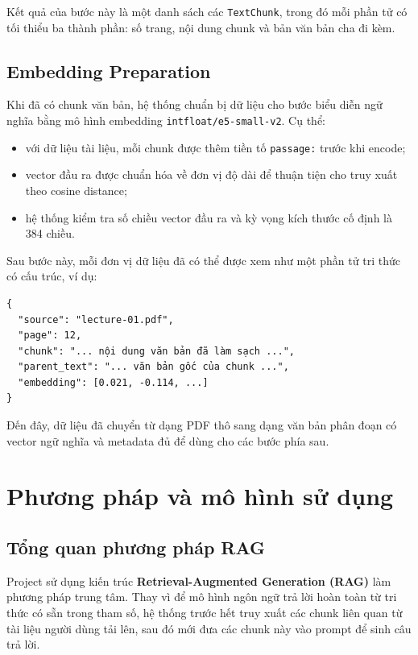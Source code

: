 \documentclass[12pt]{ai_conquer2026}
\begin{document}
Kết quả của bước này là một danh sách các \texttt{TextChunk}, trong đó mỗi phần tử có tối thiểu ba thành phần: số trang, nội dung chunk và bản văn bản cha đi kèm.

\subsection{Embedding Preparation}

Khi đã có chunk văn bản, hệ thống chuẩn bị dữ liệu cho bước biểu diễn ngữ nghĩa bằng mô hình embedding \texttt{intfloat/e5-small-v2}. Cụ thể:

\begin{itemize}
    \item với dữ liệu tài liệu, mỗi chunk được thêm tiền tố \texttt{passage:} trước khi encode;
    \item vector đầu ra được chuẩn hóa về đơn vị độ dài để thuận tiện cho truy xuất theo cosine distance;
    \item hệ thống kiểm tra số chiều vector đầu ra và kỳ vọng kích thước cố định là 384 chiều.
\end{itemize}

Sau bước này, mỗi đơn vị dữ liệu đã có thể được xem như một phần tử tri thức có cấu trúc, ví dụ:

\begin{aivnoutputbox}
\begin{verbatim}
{
  "source": "lecture-01.pdf",
  "page": 12,
  "chunk": "... nội dung văn bản đã làm sạch ...",
  "parent_text": "... văn bản gốc của chunk ...",
  "embedding": [0.021, -0.114, ...]
}
\end{verbatim}
\end{aivnoutputbox}

Đến đây, dữ liệu đã chuyển từ dạng PDF thô sang dạng văn bản phân đoạn có vector ngữ nghĩa và metadata đủ để dùng cho các bước phía sau.

\section{Phương pháp và mô hình sử dụng}

\subsection{Tổng quan phương pháp RAG}

Project sử dụng kiến trúc \textbf{Retrieval-Augmented Generation (RAG)} làm phương pháp trung tâm. Thay vì để mô hình ngôn ngữ trả lời hoàn toàn từ tri thức có sẵn trong tham số, hệ thống trước hết truy xuất các chunk liên quan từ tài liệu người dùng tải lên, sau đó mới đưa các chunk này vào prompt để sinh câu trả lời.
\end{document}
